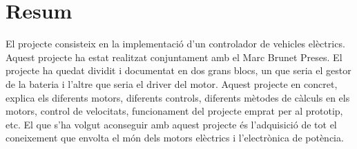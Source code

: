 \chapter{Resum}
\label{chap:Resum}

El projecte consisteix en la implementació d'un controlador de vehicles elèctrics. Aquest projecte ha estat realitzat conjuntament amb el Marc Brunet Preses. El projecte ha quedat dividit i documentat en dos grans blocs, un que seria el gestor de la bateria i l'altre que seria el driver del motor. Aquest projecte en concret, explica els diferents motors, diferents controls, diferents mètodes de càlculs en els motors, control de velocitats, funcionament del projecte emprat per al prototip, etc. El que s'ha volgut aconseguir amb aquest projecte és l'adquisició de tot el coneixement que envolta el món dels motors elèctrics i l'electrònica de potència.

